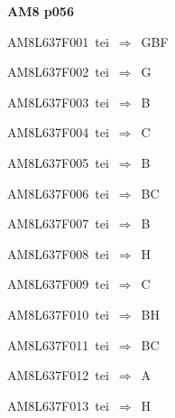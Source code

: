 \par\vfill\eject
{\bf\hfill AM8 p056\hfill\hbox{}}\par\bigskip
{\sixrm AM8L637F001\ {\sixit tei}\ }$\Rightarrow$\ GBF\par\smallskip
{\sixrm AM8L637F002\ {\sixit tei}\ }$\Rightarrow$\ G\par\smallskip
{\sixrm AM8L637F003\ {\sixit tei}\ }$\Rightarrow$\ B\par\smallskip
{\sixrm AM8L637F004\ {\sixit tei}\ }$\Rightarrow$\ C\par\smallskip
{\sixrm AM8L637F005\ {\sixit tei}\ }$\Rightarrow$\ B\par\smallskip
{\sixrm AM8L637F006\ {\sixit tei}\ }$\Rightarrow$\ BC\par\smallskip
{\sixrm AM8L637F007\ {\sixit tei}\ }$\Rightarrow$\ B\par\smallskip
{\sixrm AM8L637F008\ {\sixit tei}\ }$\Rightarrow$\ H\par\smallskip
{\sixrm AM8L637F009\ {\sixit tei}\ }$\Rightarrow$\ C\par\smallskip
{\sixrm AM8L637F010\ {\sixit tei}\ }$\Rightarrow$\ BH\par\smallskip
{\sixrm AM8L637F011\ {\sixit tei}\ }$\Rightarrow$\ BC\par\smallskip
{\sixrm AM8L637F012\ {\sixit tei}\ }$\Rightarrow$\ A\par\smallskip
{\sixrm AM8L637F013\ {\sixit tei}\ }$\Rightarrow$\ H\par\smallskip

